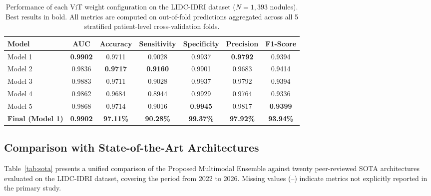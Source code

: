 \documentclass{iopjournal}
\begin{document}
\begin{table}[h]
\centering
\caption{Performance of each ViT weight configuration on the LIDC-IDRI dataset
($N=1{,}393$ nodules). Best results in bold. {\color{revblue}All metrics are computed on
out-of-fold predictions aggregated across all 5 stratified patient-level
cross-validation folds.}}\label{tab:results}
\begin{tabular}{lcccccc}
\toprule
\textbf{Model} & \textbf{AUC} & \textbf{Accuracy} & \textbf{Sensitivity} &
\textbf{Specificity} & \textbf{Precision} & \textbf{F1-Score} \\
\midrule
Model 1 & \textbf{0.9902} & 0.9711 & 0.9028 & 0.9937 & \textbf{0.9792} &
0.9394 \\
Model 2 & 0.9836 & \textbf{0.9717} & \textbf{0.9160} & 0.9901 & 0.9683 &
0.9414 \\
Model 3 & 0.9883 & 0.9711 & 0.9028 & 0.9937 & 0.9792 & 0.9394 \\
Model 4 & 0.9862 & 0.9684 & 0.8944 & 0.9929 & 0.9764 & 0.9336 \\
Model 5 & 0.9868 & 0.9714 & 0.9016 & \textbf{0.9945} & 0.9817 &
\textbf{0.9399} \\
\midrule
\textbf{Final (Model 1)} & \textbf{0.9902} & \textbf{97.11\%} &
\textbf{90.28\%} & \textbf{99.37\%} & \textbf{97.92\%} & \textbf{93.94\%} \\
\bottomrule
\end{tabular}
\end{table}

\subsection{Comparison with State-of-the-Art Architectures}

Table~\ref{tab:sota} presents a unified comparison of the Proposed Multimodal
Ensemble against twenty peer-reviewed SOTA architectures evaluated on the
LIDC-IDRI dataset, covering the period from 2022 to 2026. Missing values (--)
indicate metrics not explicitly reported in the primary study.
\end{document}
